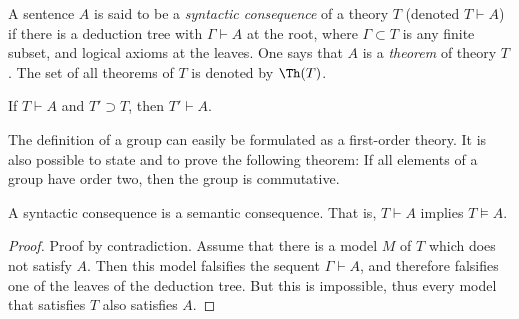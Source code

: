 \begin{page}

\begin{dfn}
A sentence $A$ is said to be a \emph{syntactic consequence} of a theory $T$ (denoted $T \vdash A$) if
there is a deduction tree with $\Gamma \vdash A$ at the root, where $\Gamma \subset T$ is any finite subset, and logical axioms at the leaves.
One says that $A$ is a \emph{theorem} of theory $T$.
The set of all theorems of $T$ is denoted by $\Th(T)$.
\end{dfn}

\end{page}

\begin{page}


\begin{exc}
If $T \vdash A$ and $T' \supset T$, then $T' \vdash A$.
\end{exc}


\end{page}

\begin{page}

\begin{exl}
The definition of a group can easily be formulated as a first-order theory.
It is also possible to state and to prove the following theorem:
If all elements of a group have order two, then the group is commutative.
\end{exl}

\end{page}

\begin{page}

\begin{lem}
A syntactic consequence is a semantic consequence.
That is, $T \vdash A$ implies $T \vDash A$.
\end{lem}

\end{page}

\begin{page}

\begin{proof}
Proof by contradiction.
Assume that there is a model $M$ of $T$ which does not satisfy $A$.
Then this model falsifies the sequent $\Gamma \vdash A$, and therefore falsifies one of the leaves of the deduction tree.
But this is impossible, thus every model that satisfies $T$ also satisfies $A$.
\end{proof}



\end{page}

